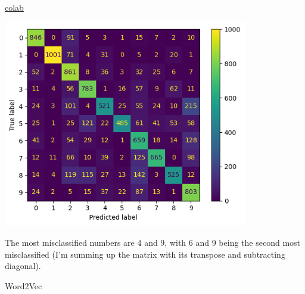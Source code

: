 \documentclass[answers]{exam}
\begin{document}
\begin{questions}
\begin{parts}
\begin{solution}
\href{https://colab.research.google.com/drive/1tJlZ-QLsr9tMvhipsfVXQ-yYTJ757TNL?usp=sharing}{colab}

\begin{center}
\includegraphics[width=0.8\textwidth]{img/4d.png}
\end{center}

The most misclassified numbers are 4 and 9, with 6 and 9 being the second most
misclassified (I'm summing up the matrix with its transpose and subtracting
diagonal).
\end{solution}
\end{parts}

\question[25] Word2Vec

\end{questions}
\end{document}
